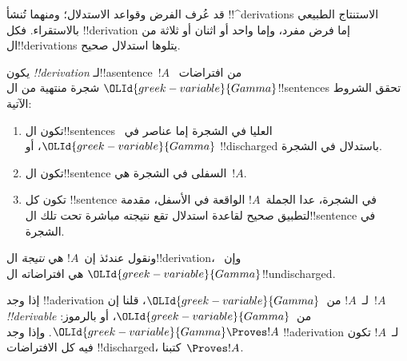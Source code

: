 \documentclass[../../../include/open-logic-section]{subfiles}
\begin{document}
      {}
      {}


\begin{explain}
قد عُرف الفرض وقواعد الاستدلال؛ ومنهما تُنشأ
!!^{derivation}s الاستنتاج الطبيعي بالاستقراء.
فكل !!{derivation} إما فرض مفرد، وإما واحد أو اثنان أو ثلاثة من ال!!{derivation}s يتلوها استدلال صحيح.
\end{explain}

\begin{defn}[!!^{derivation}]
يكون  \emph{!!{derivation}} لـ!!a{sentence}~$!A$
من افتراضات~$\OLId{greek-variable}{Gamma}$ شجرة منتهية من ال!!{sentence}s تحقق الشروط الآتية:
\begin{enumerate}
\item تكون ال!!{sentence}s العليا في الشجرة إما عناصر في~$\OLId{greek-variable}{Gamma}$، أو
  !!{discharged} باستدلال في الشجرة.
\item تكون ال!!{sentence} السفلى في الشجرة هي~$!A$.
\item تكون كل !!{sentence} في الشجرة، عدا الجملة~$!A$ الواقعة في
  الأسفل، مقدمة لتطبيق صحيح لقاعدة استدلال تقع نتيجته مباشرة تحت تلك
  ال!!{sentence} في الشجرة.
\end{enumerate}
ونقول عندئذ إن~$!A$ هي \emph{نتيجة} ال!!{derivation}، وإن~$\OLId{greek-variable}{Gamma}$ هي
افتراضاته ال!!{undischarged}.

إذا وجد !!a{derivation} لـ~$!A$ من~$\OLId{greek-variable}{Gamma}$، قلنا إن~$!A$
\emph{!!{derivable}} من~$\OLId{greek-variable}{Gamma}$، أو بالرموز: $\OLId{greek-variable}{Gamma} \Proves !A$.
وإذا وجد !!a{derivation} لـ~$!A$ تكون فيه كل الافتراضات
!!{discharged}، كتبنا~$\Proves !A$.
\end{defn}
\end{document}
